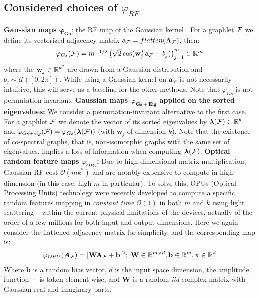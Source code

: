 \documentclass{article}
\begin{document}
\subsection{Considered choices of $\varphi_{RF}$}
\label{sec:phi_choices}
\textbf{Gaussian maps $\boldsymbol{\varphi_{Gs}}$}: the RF map of the Gaussian kernel \cite{rahimi2008random}. For a graphlet $\mathcal{F}$ we define its vectorized adjacency matrix  $\mathbf{a}_{\mathcal{F}}=flatten(\mathbf{A}_{\mathcal{F}})$, then:
\begin{equation}
\label{eq:Gaussian_map}
 \mathsmaller{\varphi_{Gs}(\F) = m^{-1/2} \left( \sqrt{2} \cos(\mathbf{w}_j^T\mathbf{a}_\F+b_j) \right)_{j=1}^m \in \mathbb{R}^m}
\end{equation}
where the $\mathbf{w}_j\in \mathbb{R}^{k^2}$ are drawn from a Gaussian distribution and $b_j \sim \mathcal{U}([0, 2\pi])$. While using a Gaussian kernel on $\mathbf{a}_\mathcal{F}$ is not necessarily intuitive, this will serve as a baseline for the other methods. Note that $\varphi_{Gs}$ is not permutation-invariant.
\BlankLine
\noindent\textbf{Gaussian maps $\boldsymbol{\varphi_{Gs+Eig}}$ applied on the sorted eigenvalues:} We consider a permutation-invariant alternative to the first case. %
For a graphlet $\mathcal{F}$ we denote the vector of its sorted eigenvalues by $\bm{\lambda}(\mathcal{F}) \in\mathbb{R}^k$ and $\varphi_{Gs+eig}(\mathcal{F}) = \varphi_{Gs}(\bm{\lambda}(\mathcal{F}))$ (with $\bm{w}_j$ of dimension $k$). Note that the existence of co-spectral graphs, that is, non-isomorphic graphs with the same set of eigenvalues, implies a loss of information when computing $\bm{\lambda}(\mathcal{F})$.
\BlankLine
\noindent\textbf{Optical random feature maps $\varphi_{OPU}$:} Due to high-dimensional matrix multiplication, Gaussian RF cost $\mathcal{O}(mk^2)$ and are notably expensive to compute in high-dimension (in this case, high $m$ in particular). To solve this, OPUs (Optical Processing Units) technology were recently developed to compute a specific random features mapping in \emph{constant time  $\mathcal{O}(1)$} in both $m$ and $k$ using light scattering \cite{saade_opu} -- within the current physical limitations of the devices, actually of the order of a few millions for both input and output dimensions. Here we again consider the flattened adjacency matrix for simplicity, and the corresponding map is:
\[
\label{OPU_equation}
\mathbf{\varphi}_{OPU}(\bm{A}_{\mathcal{F}})=|\mathbf{W\bm{A}_{\mathcal{F}}+b}|^2 ;~\mathbf{W}\in \mathbb{R}^{m\times d},\mathbf{b}\in \mathbb{R}^m, \mathbf{x}\in \mathbb{R}^d
\]
Where $\mathbf{b}$ is a random bias vector, $d$ is the input space dimension, the amplitude function $|\cdot|$ is taken element wise, and $\mathbf{W}$ is a random \emph{iid} complex matrix with Gaussian real and imaginary parts.
\end{document}
